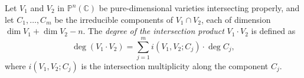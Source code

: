 Let $V_1$ and $V_2$ in $\mathbb{P}^n(\mathbb{C})$ be pure-dimensional varieties intersecting properly, and let $C_1, \ldots, C_m$ be the irreducible components of $V_1 \cap V_2$, each of dimension $\dim V_1 + \dim V_2 - n$. The \textit{degree of the intersection product} $V_1 \cdot V_2$ is defined as
\[
\deg(V_1 \cdot V_2) = \sum_{j=1}^{m} i(V_1, V_2; C_j) \cdot \deg C_j,
\]
where $i(V_1, V_2; C_j)$ is the intersection multiplicity along the component $C_j$.
